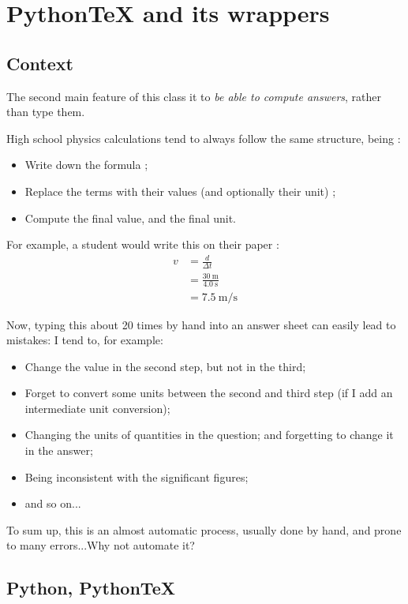 \documentclass[12pt,code]{HSP-Test}
\begin{document}
	\section{PythonTeX and its wrappers}
	\label{sec:PythonTex}
	\subsection{Context}
	\label{subsec:pythonTex_context}
	The second main feature of this class it to \emph{be able to compute answers}, rather than type them.
	
	High school physics calculations tend to always follow the same structure, being :
	\begin{itemize}
		\item Write down the formula ;
		\item Replace the terms with their values (and optionally their unit) ;
		\item Compute the final value, and the final unit.
	\end{itemize}
	
	For example, a student would write this on their paper :
	\begin{align*}
		v&=\frac{d}{\Delta t}\\
		 &=\frac{\SI{30}{\meter}}{\SI{4.0}{\second}}\\
		 &=\SI{7.5}{\meter\per\second}
	\end{align*}
	
	Now, typing this about 20 times by hand into an answer sheet can easily lead to mistakes: I tend to, for example:
	\begin{itemize}
		\item Change the value in the second step, but not in the third;
		\item Forget to convert some units between the second and third step (if I add an intermediate unit conversion);
		\item Changing the units of quantities in the question; and forgetting to change it in the answer;
		\item Being inconsistent with the significant figures;
		\item and so on...
	\end{itemize}
	To sum up, this is an almost automatic process, usually done by hand, and prone to many errors...Why not automate it?
	
	\subsection{Python, Python\TeX}
\end{document}
